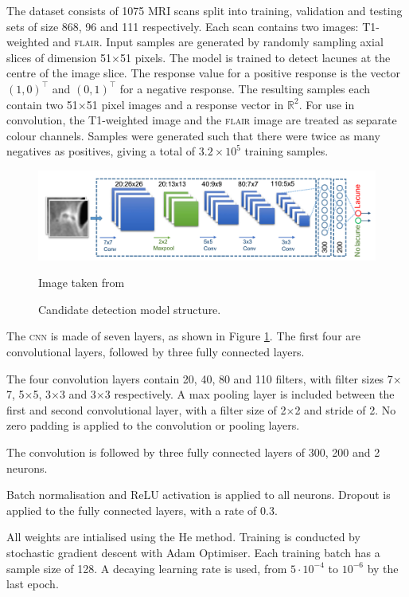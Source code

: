 The dataset consists of 1075 MRI scans split into training, validation and testing sets of size 868, 96 and 111 respectively. Each scan contains two images: T1-weighted and \textsc{flair}. Input samples are generated by randomly sampling axial slices of dimension 51$\times$51 pixels. The model is trained to detect lacunes at the centre of the image slice. The response value for a positive response is the vector $(1, 0)^\intercal$ and $(0, 1)^\intercal$ for a negative response. The resulting samples each contain two 51$\times$51 pixel images and a response vector in $\mathbb{R}^2$. For use in convolution, the T1-weighted image and the \textsc{flair} image are treated as separate colour channels. Samples were generated such that there were twice as many negatives as positives, giving a total of $3.2\times10^5$ training samples.

\begin{figure}[ht]
	\centering
	\includegraphics[width=\textwidth]{Images/5_ghafoorian_model1.png}
	\caption{Candidate detection model structure.}
	\small Image taken from \cite{GhafoorianM.2017Dml3}
	\label{litrev-ghafoorian_model1fig}
\end{figure}

The \textsc{cnn} is made of seven layers, as shown in Figure \ref{litrev-ghafoorian_model1fig}. The first four are convolutional layers, followed by three fully connected layers.

The four convolution layers contain 20, 40, 80 and 110 filters, with filter sizes 7$\times$7, 5$\times$5, 3$\times$3 and 3$\times$3 respectively. A max pooling layer is included between the first and second convolutional layer, with a filter size of 2$\times$2 and stride of 2. No zero padding is applied to the convolution or pooling layers.

The convolution is followed by three fully connected layers of 300, 200 and 2 neurons.

Batch normalisation and ReLU activation is applied to all neurons. Dropout is applied to the fully connected layers, with a rate of 0.3.

All weights are intialised using the He method. Training is conducted by stochastic gradient descent with Adam Optimiser. Each training batch has a sample size of 128. A decaying learning rate is used, from $5\cdot10^{-4}$ to $10^{-6}$ by the last epoch.

